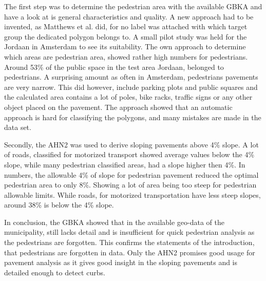 The first step was to determine the pedestrian area with the available GBKA and have a look at is general characteristics and quality. A new approach had to be invented, as Matthews et al. did, for no label was attached with which target group the dedicated polygon belongs to. A small pilot study was held for the Jordaan in Amsterdam to see its suitability. The own approach to determine which areas are pedestrian area, showed rather high numbers for pedestrians. Around 53\% of the public space in the test area Jordaan, belonged to pedestrians. A surprising amount as often in Amsterdam, pedestrians pavements are very narrow. This did however, include parking plots and public squares and the calculated area contains a lot of poles, bike racks, traffic signs or any other object placed on the pavement. The approach showed that an automatic approach is hard for classifying the polygons, and many mistakes are made in the data set. 

Secondly, the AHN2 was used to derive sloping pavements above 4\% slope. A lot of roads, classified for motorized transport showed average values below the 4\% slope, while many pedestrian classified areas, had a slope higher then 4\%. In numbers, the allowable 4\% of slope for pedestrian pavement reduced the optimal pedestrian area to only 8\%. Showing a lot of area being too steep for pedestrian allowable limits. While roads, for motorized transportation have less steep slopes, around 38\% is below the 4\% slope. 

In conclusion, the GBKA showed that in the available geo-data of the municipality, still lacks detail and is insufficient for quick pedestrian analysis as the pedestrians are forgotten. This confirms the statements of the introduction, that pedestrians are forgotten in data. Only the AHN2 promises good usage for pavement analysis as it gives good insight in the sloping pavements and is detailed enough to detect curbs. 

